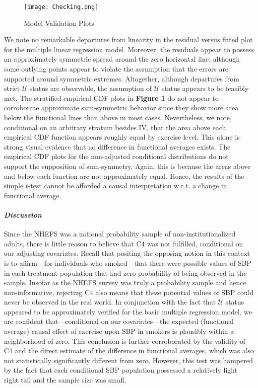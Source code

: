 \documentclass[12pt]{amsart}
\theoremstyle{plain}%
\theoremstyle{definition}
\theoremstyle{remark}
\numberwithin{equation}{section}
\begin{document}
\begin{figure}[H]
\caption{Model Validation Plots}
\texttt{[image: Checking.png]} 
\end{figure}
We note no remarkable departures from linearity in the residual versus fitted plot for the multiple linear regression model. Moreover, the residuals appear to possess an approximately symmetric spread around the zero horizontal line, although some outlying points appear to violate the assumption that the errors are supported around symmetric extremes. Altogether, although departures from strict $\mathcal{U}$ status are observable, the assumption of $\mathcal{U}$ status appears to be feasibly met. The stratified empirical CDF plots in \textbf{Figure 1} do not appear to corroborate approximate sum-symmetric behavior since they show more area below the functional lines than above in most cases. Nevertheless, we note, conditional on an arbitrary stratum besides IV, that the area above each empirical CDF function appears roughly equal by exercise level. This alone is strong visual evidence that no difference in functional averages exists. The empirical CDF plots for the non-adjusted conditional distributions do not support the supposition of sum-symmetry. Again, this is because the areas above and below each function are not approximately equal. Hence, the results of the simple $t$-test cannot be afforded a causal interpretation w.r.t. a change in functional average.
\newline
\paragraph{\textit{Discussion}} Since the NHEFS was a national probability sample of non-institutionalized adults, there is little reason to believe that C4 was not fulfilled, conditional on our adjusting covariates. Recall that positing the opposing notion in this context is to affirm---for individuals who smoked---that there were possible values of SBP in each treatment population that had zero probability of being observed in the sample. Insofar as the NHEFS survey was truly a probability sample and hence non-informative, rejecting C4 also means that these potential values of SBP could never be observed in the real world. In conjunction with the fact that $\mathcal{U}$ status appeared to be approximately verified for the basic multiple regression model, we are confident that---conditional on our covariates---the expected (functional average) causal effect of exercise upon SBP in smokers is plausibly within a neighborhood of zero. This conclusion is further corroborated by the validity of C4 and the direct estimate of the difference in functional averages, which was also not statistically significantly different from zero. However, this test was hampered by the fact that each conditional SBP population possessed a relatively light right tail and the sample size was small.
\end{document}
